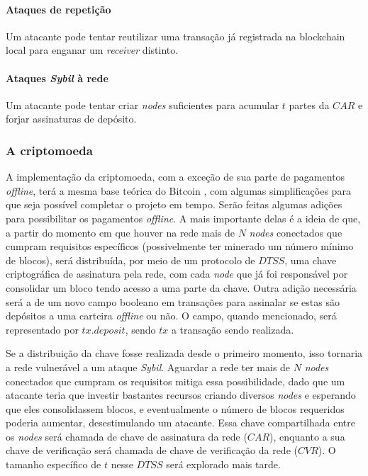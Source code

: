 \documentclass[
  12pt,
  a4paper,
  oneside,
  article,
]{abntex2}
\begin{document}
\paragraph{Ataques de repetição}
Um atacante pode tentar reutilizar uma transação já registrada na blockchain local para enganar um \textit{receiver} distinto.

\paragraph{Ataques \textit{Sybil} à rede}
Um atacante pode tentar criar \textit{nodes} suficientes para acumular $t$ partes da $CAR$ e forjar assinaturas de depósito.

\subsubsection{A criptomoeda}

A implementação da criptomoeda, com a exceção de sua parte de pagamentos \textit{offline}, terá a mesma base teórica do Bitcoin \cite{nakamoto2008} \cite{bitcoinorg}, com algumas simplificações para que seja possível completar o projeto em tempo. Serão feitas algumas adições para possibilitar os pagamentos \textit{offline}. A mais importante delas é a ideia de que, a partir do momento em que houver na rede mais de $N$ \textit{nodes} conectados que cumpram requisitos específicos (possivelmente ter minerado um número mínimo de blocos), será distribuída, por meio de um protocolo de $DTSS$, uma chave criptográfica de assinatura pela rede, com cada \textit{node} que já foi responsável por consolidar um bloco tendo acesso a uma parte da chave. Outra adição necessária será a de um novo campo booleano em transações para assinalar se estas são depósitos a uma carteira \textit{offline} ou não. O campo, quando mencionado, será representado por $tx.deposit$, sendo $tx$ a transação sendo realizada.

Se a distribuição da chave fosse realizada desde o primeiro momento, isso tornaria a rede vulnerável a um ataque \textit{Sybil}. Aguardar a rede ter mais de $N$ \textit{nodes} conectados que cumpram os requisitos mitiga essa possibilidade, dado que um atacante teria que investir bastantes recursos criando diversos \textit{nodes} e esperando que eles consolidassem blocos, e eventualmente o número de blocos requeridos poderia aumentar, desestimulando um atacante. Essa chave compartilhada entre os \textit{nodes} será chamada de chave de assinatura da rede ($CAR$), enquanto a sua chave de verificação será chamada de chave de verificação da rede ($CVR$). O tamanho específico de $t$ nesse $DTSS$ será explorado mais tarde.
\end{document}
